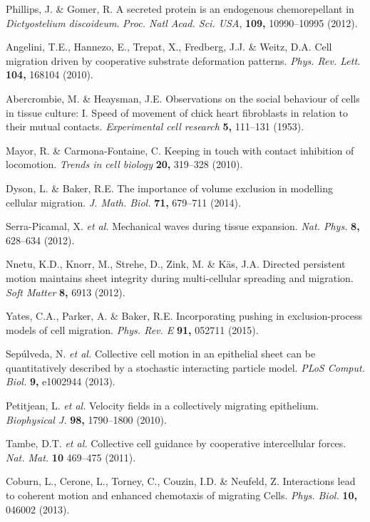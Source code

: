 \documentclass[11pt, twocolumn]{article}
\begin{document}
\begin{thebibliography}{10}
 Phillips, J. \& Gomer, R. A secreted protein is an endogenous chemorepellant in \textit{Dictyostelium discoideum}.
  {\em Proc. Natl Acad. Sci. USA}, \textbf{109,} 10990--10995 (2012).

Angelini, T.E., Hannezo, E., Trepat, X., Fredberg, J.J. \& Weitz, D.A. Cell migration driven by cooperative substrate deformation patterns.
 {\em Phys. Rev. Lett.} {\bf 104,} 168104 (2010).
 
Abercrombie, M. \& Heaysman, J.E.
Observations on the social behaviour of cells in tissue culture: I. Speed of movement of chick heart fibroblasts in relation to their mutual contacts.
\textit{Experimental cell research} \textbf{5,} 111--131 (1953).

  Mayor, R. \& Carmona-Fontaine, C. Keeping in touch with contact inhibition of locomotion.
 {\em Trends in cell biology} \textbf{20,} 319--328 (2010).

Dyson, L. \& Baker, R.E. The importance of volume exclusion in modelling cellular migration.
 {\em J. Math. Biol.} {\bf 71,} 679--711 (2014).

Serra-Picamal, X. \textit{et al.} Mechanical waves during tissue expansion.
 {\em Nat. Phys.} \textbf{8,} 628--634 (2012).
 
Nnetu, K.D., Knorr, M., Strehe, D., Zink, M. \& K\"as, J.A. Directed persistent motion maintains sheet integrity during multi-cellular spreading and migration.
 {\em Soft Matter} \textbf{8,} 6913 (2012).
 
Yates, C.A., Parker, A. \& Baker, R.E. Incorporating pushing in exclusion-process models of cell migration.
 {\em Phys. Rev. E} \textbf{91,} 052711 (2015).

Sep\'ulveda, N. \textit{et al.} Collective cell motion in an epithelial sheet can be quantitatively described by a stochastic interacting particle model.
 {\em PLoS Comput. Biol.} \textbf{9,} e1002944 (2013).

Petitjean, L. \textit{et al.} Velocity fields in a collectively migrating epithelium.
 {\em Biophysical J.} \textbf{98,} 1790--1800 (2010).

Tambe, D.T. \textit{et al.} Collective cell guidance by cooperative intercellular forces.
 {\em Nat. Mat.} \textbf{10} 469--475 (2011).

Coburn, L., Cerone, L., Torney, C., Couzin, I.D. \& Neufeld, Z. Interactions lead to coherent motion and enhanced chemotaxis of migrating Cells.
  {\em Phys. Biol.} \textbf{10,} 046002 (2013).


\end{thebibliography}
\end{document}
